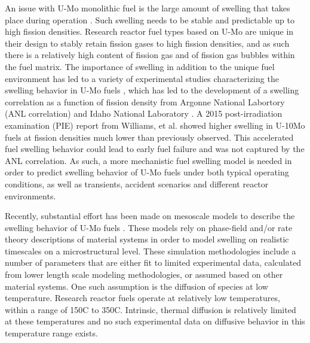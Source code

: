 \documentclass[review]{elsarticle}
\begin{document}
An issue with U-Mo monolithic fuel is the large amount of swelling that takes place during operation \cite{hofman1997}. Such swelling needs to be stable and predictable up to high fission densities. Research reactor fuel types based on U-Mo are unique in their design to stably retain fission gases to high fission densities, and as such there is a relatively high content of fission gas and of fission gas bubbles within the fuel matrix. The importance of swelling in addition to the unique fuel environment has led to a variety of experimental studies characterizing the swelling behavior in U-Mo fuels \cite{rest2009, kim_anl08, meyer2002, kim2013}, which has led to the development of a swelling correlation as a function of fission density from Argonne National Labortory (ANL correlation) \cite{kim2011} and Idaho National Laboratory \cite{umo_prelim_report2017}. A 2015 post-irradiation examination (PIE) report \cite{afip6report} from Williams, et al. showed higher swelling in U-10Mo fuels at fission densities much lower than previously observed. This accelerated fuel swelling behavior could lead to early fuel failure and was not captured by the ANL correlation. As such, a more mechanistic fuel swelling model is needed in order to predict swelling behavior of U-Mo fuels under both typical operating conditions, as well as transients, accident scenarios and different reactor environments.

Recently, substantial effort has been made on mesoscale models to describe the swelling behavior of U-Mo fuels \cite{liang2018, liang2018a, liang2017, liang2016, ye2018, hu2017a, hu2016, hu2016a}. These models rely on phase-field and/or rate theory descriptions of material systems in order to model swelling on realistic timescales on a microstructural level. These simulation methodologies include a number of parameters that are either fit to limited experimental data, calculated from lower length scale modeling methodologies, or assumed based on other material systems. One such assumption is the diffusion of species at low temperature. Research reactor fuels operate at relatively low temperatures, within a range of 150\degree C to 350\degree C. Intrinsic, thermal diffusion is relatively limited at these temperatures and no such experimental data on diffusive behavior in this temperature range exists. 
\end{document}
